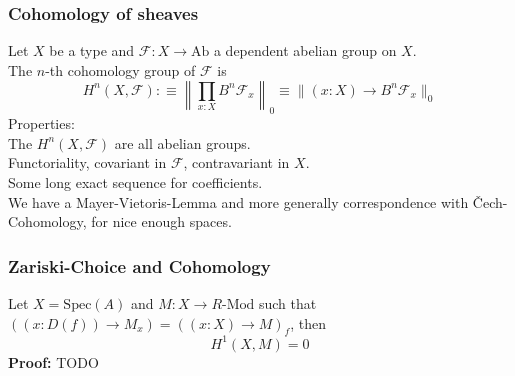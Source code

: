 \documentclass{beamer}
\begin{document}
\begin{frame}
  \frametitle{Cohomology of sheaves}
  Let $X$ be a type and $\mathcal F:X\to \mathrm{Ab}$ a dependent abelian group on $X$. \\
  \pause
  The $n$-th cohomology group of $\mathcal F$ is
  \[ H^n(X,\mathcal F):\equiv\left\|\prod_{x:X}B^n\mathcal F_x\right\|_0\equiv \|(x:X)\to B^n\mathcal F_x\|_0 \]
  \pause
  Properties: \\
  \pause
  The $H^n(X,\mathcal F)$ are all abelian groups. \\
  \pause
  Functoriality, covariant in $\mathcal F$, contravariant in $X$. \\
  \pause
  Some long exact sequence for coefficients. \\
  \pause
  We have a Mayer-Vietoris-Lemma and more generally correspondence with \v{C}ech-Cohomology, for nice enough spaces. \\
\end{frame}

\begin{frame}
  \frametitle{Zariski-Choice and Cohomology}  
  Let $X=\mathrm{Spec}(A)$ and $M:X\to R\text{-Mod}$ such that $((x:D(f))\to M_x)=((x:X)\to M)_f$, then
  \[ H^1(X,M)=0 \]
  \pause
  \textbf{Proof:} TODO
\end{frame}
\end{document}
